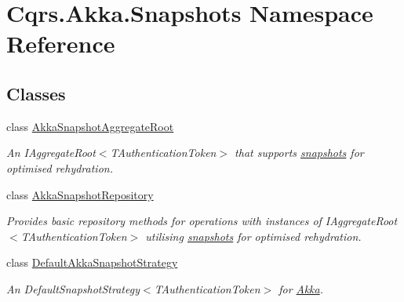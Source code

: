 \hypertarget{namespaceCqrs_1_1Akka_1_1Snapshots}{}\section{Cqrs.\+Akka.\+Snapshots Namespace Reference}
\label{namespaceCqrs_1_1Akka_1_1Snapshots}
\subsection*{Classes}
\begin{DoxyCompactItemize}
\item 
class \hyperlink{classCqrs_1_1Akka_1_1Snapshots_1_1AkkaSnapshotAggregateRoot}{Akka\+Snapshot\+Aggregate\+Root}
\begin{DoxyCompactList}\small\item\em An I\+Aggregate\+Root$<$\+T\+Authentication\+Token$>$ that supports \hyperlink{}{snapshots} for optimised rehydration. \end{DoxyCompactList}\item 
class \hyperlink{classCqrs_1_1Akka_1_1Snapshots_1_1AkkaSnapshotRepository}{Akka\+Snapshot\+Repository}
\begin{DoxyCompactList}\small\item\em Provides basic repository methods for operations with instances of I\+Aggregate\+Root$<$\+T\+Authentication\+Token$>$ utilising \hyperlink{}{snapshots} for optimised rehydration. \end{DoxyCompactList}\item 
class \hyperlink{classCqrs_1_1Akka_1_1Snapshots_1_1DefaultAkkaSnapshotStrategy}{Default\+Akka\+Snapshot\+Strategy}
\begin{DoxyCompactList}\small\item\em An Default\+Snapshot\+Strategy$<$\+T\+Authentication\+Token$>$ for \hyperlink{namespaceCqrs_1_1Akka}{Akka}. \end{DoxyCompactList}\end{DoxyCompactItemize}
